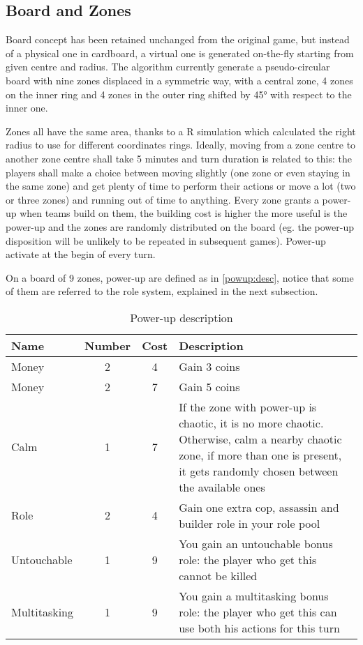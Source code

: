 		\subsection{Board and Zones}\label{design:board}
		
			Board concept has been retained unchanged from the original game, but instead of a physical one in cardboard, a virtual one is generated on-the-fly starting from given centre and radius.
			The algorithm currently generate a pseudo-circular board with nine zones displaced in a symmetric way, with a central zone, 4 zones on the inner ring and 4 zones in the outer ring shifted by 45° with respect to the inner one.
			
			
			Zones all have the same area, thanks to a R simulation which calculated the right radius to use for different coordinates rings.
			Ideally, moving from a zone centre to another zone centre shall take 5 minutes and turn duration is related to this: the players shall make a choice between moving slightly (one zone or even staying in the same zone) and get plenty of time to perform their actions or move a lot (two or three zones) and running out of time to anything.
			Every zone grants a power-up when teams build on them, the building cost is higher the more useful is the power-up and the zones are randomly distributed on the board (eg. the power-up disposition will be unlikely to be repeated in subsequent games).
			Power-up activate at the begin of every turn.
			
			On a board of 9 zones, power-up are defined as in \autoref{powup:desc}, notice that some of them are referred to the role system, explained in the next subsection.
			
			\begin{table}
				\caption{Power-up description}
				\label{powup:desc}
				\centering
				\begin{tabular}{lccp{}}
					\toprule
					Name 			& Number 	& Cost 	& Description \\
					\midrule
					Money 			& 2 		& 4 	& Gain 3 coins \\
					Money 			& 2 		& 7 	& Gain 5 coins \\
					Calm 			& 1 		& 7 	& If the zone with power-up is chaotic, it is no more chaotic. Otherwise, calm a nearby chaotic zone, if more than one is present, it gets randomly chosen between the available ones \\
					Role 			& 2 		& 4 	& Gain one extra cop, assassin and builder role in your role pool \\
					Untouchable 	& 1 		& 9 	& You gain an untouchable bonus role: the player who get this cannot be killed \\
					Multitasking 	& 1 		& 9 	& You gain a multitasking bonus role: the player who get this can use both his actions for this turn \\
					\bottomrule
				\end{tabular}
			\end{table}
		
